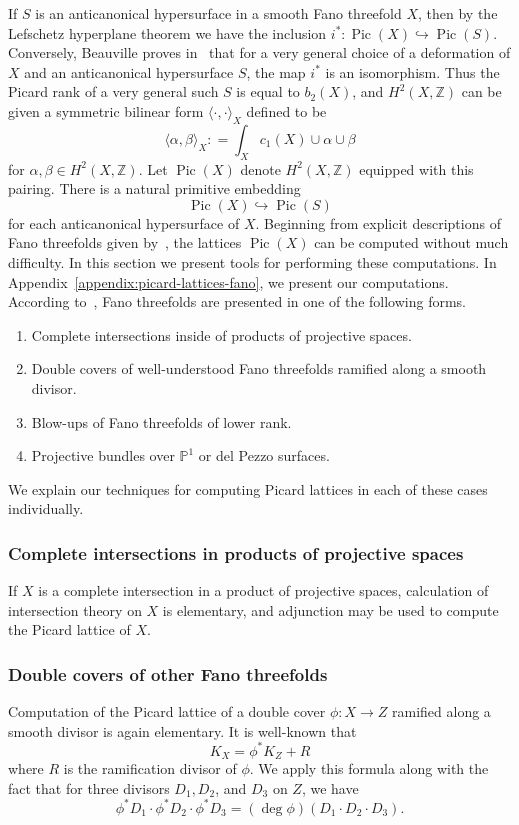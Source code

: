 \documentclass[10pt]{amsart}
\numberwithin{equation}{section}
\theoremstyle{plain}
\theoremstyle{definition}
\theoremstyle{remark}
\DeclareMathOperator{\Pic}{Pic}
\begin{document}
If \(S\) is an anticanonical hypersurface in a smooth Fano threefold \(X\), then by the Lefschetz hyperplane theorem we have the inclusion \(i^* \colon \Pic(X) \hookrightarrow \Pic(S)\). Conversely, Beauville proves in~\cite{beauvillefano} that for a very general choice of a deformation of \(X\) and an anticanonical hypersurface \(S\), the map \(i^*\) is an isomorphism. Thus the Picard rank of a very general such \(S\) is equal to \(b_2(X)\), and \(H^2(X,\mathbb{Z})\) can be given a symmetric bilinear form \(\langle \cdot, \cdot \rangle_X\) defined to be
\[
  \langle \alpha, \beta \rangle_X : = \int_X c_1(X)\cup \alpha\cup \beta
\]
for \(\alpha,\beta \in H^2(X,\mathbb{Z})\). Let \(\Pic(X)\) denote \(H^2(X,\mathbb{Z})\) equipped with this pairing. There is a natural primitive embedding
\[
  \Pic(X) \hookrightarrow \Pic(S)
\]
for each anticanonical hypersurface of \(X\). Beginning from explicit descriptions of Fano threefolds given by~\cite{mori1981classification}, the lattices \(\Pic(X)\) can be computed without much difficulty.  In this section we present tools for performing these computations. In Appendix~\ref{appendix:picard-lattices-fano}, we present our computations. According to~\cite{mori1981classification}, Fano threefolds are presented in one of the following forms.
\begin{enumerate}
\item Complete intersections inside of products of projective spaces.
\item Double covers of well-understood Fano threefolds ramified along a smooth divisor.
\item Blow-ups of Fano threefolds of lower rank.
\item Projective bundles over \(\mathbb{P}^1\) or del Pezzo surfaces.
\end{enumerate}
We explain our techniques for computing Picard lattices in each of these cases individually.

\subsubsection{Complete intersections in products of projective spaces}
If \(X\) is a complete intersection in a product of projective spaces, calculation of intersection theory on \(X\) is elementary, and adjunction may be used to compute the Picard lattice of \(X\).

\subsubsection{Double covers of other Fano threefolds}
Computation of the Picard lattice of a double cover \(\phi:X \rightarrow Z\) ramified along a smooth divisor is again elementary. It is well-known that
\[
  K_X = \phi^*K_Z + R
\]
where \(R\) is the ramification divisor of \(\phi\). We apply this formula along with the fact that for three divisors \(D_1,D_2\), and \(D_3\) on \(Z\), we have
\[
  \phi^*D_1 \cdot \phi^* D_2 \cdot \phi^* D_3 = (\deg \phi)( D_1 \cdot D_2 \cdot D_3).
\]
\end{document}
